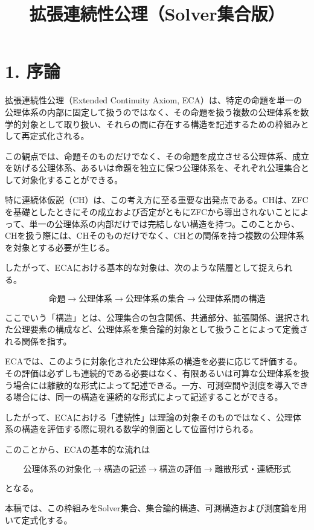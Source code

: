 \documentclass[12pt,a4paper]{article}
\title{拡張連続性公理（Solver集合版）}
\author{}
\date{}
\begin{document}
\maketitle

\section{1. 序論}

拡張連続性公理（Extended Continuity Axiom, ECA）は、特定の命題を単一の公理体系の内部に固定して扱うのではなく、その命題を扱う複数の公理体系を数学的対象として取り扱い、それらの間に存在する構造を記述するための枠組みとして再定式化される。

この観点では、命題そのものだけでなく、その命題を成立させる公理体系、成立を妨げる公理体系、あるいは命題を独立に保つ公理体系を、それぞれ公理集合として対象化することができる。

特に連続体仮説（CH）は、この考え方に至る重要な出発点である。CHは、ZFCを基礎としたときにその成立および否定がともにZFCから導出されないことによって、単一の公理体系の内部だけでは完結しない構造を持つ。このことから、CHを扱う際には、CHそのものだけでなく、CHとの関係を持つ複数の公理体系を対象とする必要が生じる。

したがって、ECAにおける基本的な対象は、次のような階層として捉えられる。

\[
\boxed{
\text{命題}
\longrightarrow
\text{公理体系}
\longrightarrow
\text{公理体系の集合}
\longrightarrow
\text{公理体系間の構造}
}
\]

ここでいう「構造」とは、公理集合の包含関係、共通部分、拡張関係、選択された公理要素の構成など、公理体系を集合論的対象として扱うことによって定義される関係を指す。

ECAでは、このように対象化された公理体系の構造を必要に応じて評価する。その評価は必ずしも連続的である必要はなく、有限あるいは可算な公理体系を扱う場合には離散的な形式によって記述できる。一方、可測空間や測度を導入できる場合には、同一の構造を連続的な形式によって記述することができる。

したがって、ECAにおける「連続性」は理論の対象そのものではなく、公理体系の構造を評価する際に現れる数学的側面として位置付けられる。

このことから、ECAの基本的な流れは

\[
\boxed{
\text{公理体系の対象化}
\rightarrow
\text{構造の記述}
\rightarrow
\text{構造の評価}
\rightarrow
\text{離散形式・連続形式}
}
\]

となる。

本稿では、この枠組みをSolver集合、集合論的構造、可測構造および測度論を用いて定式化する。
\end{document}
